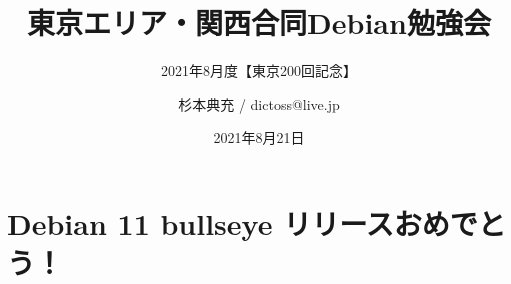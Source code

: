 \title{東京エリア・関西合同Debian勉強会}
\subtitle{2021年8月度【東京200回記念】} %
\author{杉本典充 / dictoss@live.jp}
\date{2021年8月21日}



\begin{frame}
\titlepage{}
\end{frame}


\section{Debian 11 bullseye リリースおめでとう！}


